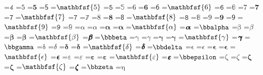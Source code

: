 \documentclass{article}
\begin{document}
=\hbox{$\mathbb{4}$}
=\hbox{$\mathrm{5}$}
=\hbox{$\mathbf{5}$}
=\hbox{$\mathsf{5}$}
=\hbox{$\mathbfsf{5}$}
=\hbox{$\mathtt{5}$}
=\hbox{$\mathbb{5}$}
=\hbox{$\mathrm{6}$}
=\hbox{$\mathbf{6}$}
=\hbox{$\mathsf{6}$}
=\hbox{$\mathbfsf{6}$}
=\hbox{$\mathtt{6}$}
=\hbox{$\mathbb{6}$}
=\hbox{$\mathrm{7}$}
=\hbox{$\mathbf{7}$}
=\hbox{$\mathsf{7}$}
=\hbox{$\mathbfsf{7}$}
=\hbox{$\mathtt{7}$}
=\hbox{$\mathbb{7}$}
=\hbox{$\mathrm{8}$}
=\hbox{$\mathbf{8}$}
=\hbox{$\mathsf{8}$}
=\hbox{$\mathbfsf{8}$}
=\hbox{$\mathtt{8}$}
=\hbox{$\mathbb{8}$}
=\hbox{$\mathrm{9}$}
=\hbox{$\mathbf{9}$}
=\hbox{$\mathsf{9}$}
=\hbox{$\mathbfsf{9}$}
=\hbox{$\mathtt{9}$}
=\hbox{$\mathbb{9}$}
=\hbox{$\mathrm{\alpha}$}
=\hbox{$\mathit{\alpha}$}
=\hbox{$\mathbf{\alpha}$}
=\hbox{$\mathbfup{\alpha}$}
=\hbox{$\mathbfsf{\alpha}$}
=\hbox{$\mathbfsfit{\alpha}$}
=\hbox{$\bbalpha $}
=\hbox{$\mathrm{\beta}$}
=\hbox{$\mathit{\beta}$}
=\hbox{$\mathbf{\beta}$}
=\hbox{$\mathbfup{\beta}$}
=\hbox{$\mathbfsf{\beta}$}
=\hbox{$\mathbfsfit{\beta}$}
=\hbox{$\bbbeta $}
=\hbox{$\mathrm{\gamma}$}
=\hbox{$\mathit{\gamma}$}
=\hbox{$\mathbf{\gamma}$}
=\hbox{$\mathbfup{\gamma}$}
=\hbox{$\mathbfsf{\gamma}$}
=\hbox{$\mathbfsfit{\gamma}$}
=\hbox{$\bbgamma $}
=\hbox{$\mathrm{\delta}$}
=\hbox{$\mathit{\delta}$}
=\hbox{$\mathbf{\delta}$}
=\hbox{$\mathbfup{\delta}$}
=\hbox{$\mathbfsf{\delta}$}
=\hbox{$\mathbfsfit{\delta}$}
=\hbox{$\bbdelta $}
=\hbox{$\mathrm{\epsilon}$}
=\hbox{$\mathit{\epsilon}$}
=\hbox{$\mathbf{\epsilon}$}
=\hbox{$\mathbfup{\epsilon}$}
=\hbox{$\mathbfsf{\epsilon}$}
=\hbox{$\mathbfsfit{\epsilon}$}
=\hbox{$\mathrm{\varepsilon}$}
=\hbox{$\mathit{\varepsilon}$}
=\hbox{$\mathbf{\varepsilon}$}
=\hbox{$\mathbfup{\varepsilon}$}
=\hbox{$\mathbfsf{\varepsilon}$}
=\hbox{$\mathbfsfit{\varepsilon}$}
=\hbox{$\bbepsilon $}
=\hbox{$\mathrm{\zeta}$}
=\hbox{$\mathit{\zeta}$}
=\hbox{$\mathbf{\zeta}$}
=\hbox{$\mathbfup{\zeta}$}
=\hbox{$\mathbfsf{\zeta}$}
=\hbox{$\mathbfsfit{\zeta}$}
=\hbox{$\bbzeta $}
=\hbox{$\mathrm{\eta}$}
\end{document}
